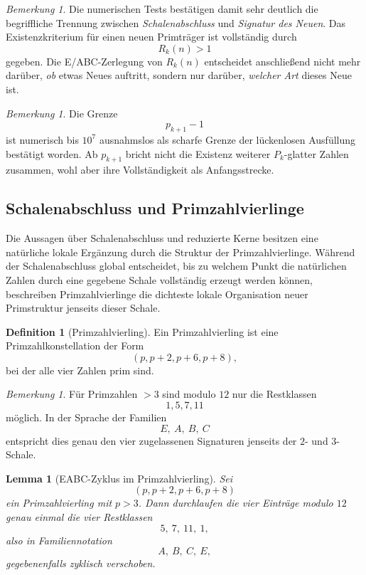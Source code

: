 \documentclass[11pt,a4paper]{article}
\newtheorem{lemma}[satz]{Lemma}
\theoremstyle{definition}
\newtheorem{definition}[satz]{Definition}
\theoremstyle{remark}
\newtheorem{bemerkung}[satz]{Bemerkung}
\begin{document}
	\begin{bemerkung}
		Die numerischen Tests bestätigen damit sehr deutlich die begriffliche Trennung zwischen
		\emph{Schalenabschluss} und \emph{Signatur des Neuen}. Das Existenzkriterium für einen
		neuen Primträger ist vollständig durch
		\[
		R_k(n)>1
		\]
		gegeben. Die E/ABC-Zerlegung von \(R_k(n)\) entscheidet anschließend nicht mehr darüber,
		\emph{ob} etwas Neues auftritt, sondern nur darüber, \emph{welcher Art} dieses Neue ist.
	\end{bemerkung}
	
	\begin{bemerkung}
		Die Grenze
		\[
		p_{k+1}-1
		\]
		ist numerisch bis \(10^7\) ausnahmslos als scharfe Grenze der lückenlosen Ausfüllung
		bestätigt worden. Ab \(p_{k+1}\) bricht nicht die Existenz weiterer \(P_k\)-glatter Zahlen
		zusammen, wohl aber ihre Vollständigkeit als Anfangsstrecke.
	\end{bemerkung}
	
	\subsection{Schalenabschluss und Primzahlvierlinge}
	
	Die Aussagen über Schalenabschluss und reduzierte Kerne besitzen eine natürliche lokale
	Ergänzung durch die Struktur der Primzahlvierlinge. Während der Schalenabschluss global
	entscheidet, bis zu welchem Punkt die natürlichen Zahlen durch eine gegebene Schale
	vollständig erzeugt werden können, beschreiben Primzahlvierlinge die dichteste lokale
	Organisation neuer Primstruktur jenseits dieser Schale.
	
	\begin{definition}[Primzahlvierling]
		Ein Primzahlvierling ist eine Primzahlkonstellation der Form
		\[
		(p,p+2,p+6,p+8),
		\]
		bei der alle vier Zahlen prim sind.
	\end{definition}
	
	\begin{bemerkung}
		Für Primzahlen \(>3\) sind modulo \(12\) nur die Restklassen
		\[
		1,5,7,11
		\]
		möglich. In der Sprache der Familien
		\[
		E,\ A,\ B,\ C
		\]
		entspricht dies genau den vier zugelassenen Signaturen jenseits der \(2\)- und
		\(3\)-Schale.
	\end{bemerkung}
	
	\begin{lemma}[EABC-Zyklus im Primzahlvierling]
		\label{lem:vierling_eabc}
		Sei
		\[
		(p,p+2,p+6,p+8)
		\]
		ein Primzahlvierling mit \(p>3\). Dann durchlaufen die vier Einträge modulo \(12\) genau
		einmal die vier Restklassen
		\[
		5,\ 7,\ 11,\ 1,
		\]
		also in Familiennotation
		\[
		A,\ B,\ C,\ E,
		\]
		gegebenenfalls zyklisch verschoben.
	\end{lemma}
	
\end{document}
